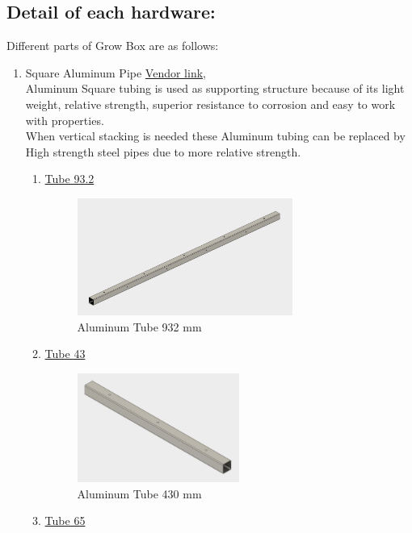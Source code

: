 \documentclass[a4paper,12pt,oneside]{book}
\begin{document}
  \subsection{Detail of each hardware:}
  Different parts of Grow Box are as follows:
   \begin{enumerate}
  \item Square Aluminum Pipe  \href{https://www.justdial.com/Mumbai/Variety-Aluminium-Ghatkopar-West/022P1932129_BZDET}{Vendor link},\\
  Aluminum Square tubing is used as supporting structure because of its light weight, relative strength, superior resistance to corrosion and easy to work with properties.\\
  When vertical stacking is needed these Aluminum tubing can be replaced by High strength steel pipes due to more relative strength.
  \begin{enumerate}
  \item \href{http://a360.co/2sqg5SJ}{Tube 93.2}\\
  \begin{figure}[h!]\begin{center}
  \includegraphics[width=200pt]{tube93}
  \caption{Aluminum Tube 932 mm}
\end{center}\end{figure}
  \item \href{http://a360.co/2tpFQUh}{Tube 43}\\
  \begin{figure}[h!]\begin{center}
  \includegraphics[width=150pt]{tube43} 
  \caption{Aluminum Tube 430 mm}
\end{center}\end{figure} 
\item \href{http://a360.co/2tpFQUh}{Tube 65}\\

\end{enumerate}
\end{enumerate}
\end{document}
